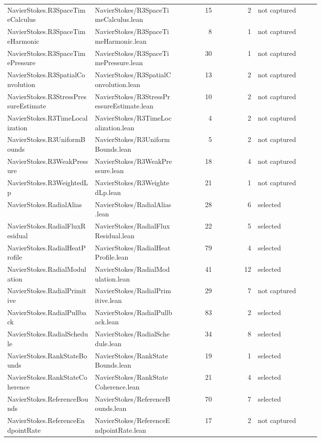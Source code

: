 \documentclass[10pt]{article}
\begin{document}
\begin{longtable}{p{0.28\linewidth}p{0.27\linewidth}r r p{0.20\linewidth}}
NavierStokes.R3SpaceTimeCalculus & NavierStokes/R3SpaceTimeCalculus.lean & 15 & 2 & not captured\\
NavierStokes.R3SpaceTimeHarmonic & NavierStokes/R3SpaceTimeHarmonic.lean & 8 & 1 & not captured\\
NavierStokes.R3SpaceTimePressure & NavierStokes/R3SpaceTimePressure.lean & 30 & 1 & not captured\\
NavierStokes.R3SpatialConvolution & NavierStokes/R3SpatialConvolution.lean & 13 & 2 & not captured\\
NavierStokes.R3StressPressureEstimate & NavierStokes/R3StressPressureEstimate.lean & 10 & 2 & not captured\\
NavierStokes.R3TimeLocalization & NavierStokes/R3TimeLocalization.lean & 4 & 2 & not captured\\
NavierStokes.R3UniformBounds & NavierStokes/R3UniformBounds.lean & 5 & 2 & not captured\\
NavierStokes.R3WeakPressure & NavierStokes/R3WeakPressure.lean & 18 & 4 & not captured\\
NavierStokes.R3WeightedLp & NavierStokes/R3WeightedLp.lean & 21 & 1 & not captured\\
NavierStokes.RadialAlias & NavierStokes/RadialAlias.lean & 28 & 6 & selected\\
NavierStokes.RadialFluxResidual & NavierStokes/RadialFluxResidual.lean & 22 & 5 & selected\\
NavierStokes.RadialHeatProfile & NavierStokes/RadialHeatProfile.lean & 79 & 4 & selected\\
NavierStokes.RadialModulation & NavierStokes/RadialModulation.lean & 41 & 12 & selected\\
NavierStokes.RadialPrimitive & NavierStokes/RadialPrimitive.lean & 29 & 7 & not captured\\
NavierStokes.RadialPullback & NavierStokes/RadialPullback.lean & 83 & 2 & selected\\
NavierStokes.RadialSchedule & NavierStokes/RadialSchedule.lean & 34 & 8 & selected\\
NavierStokes.RankStateBounds & NavierStokes/RankStateBounds.lean & 19 & 1 & selected\\
NavierStokes.RankStateCoherence & NavierStokes/RankStateCoherence.lean & 21 & 4 & selected\\
NavierStokes.ReferenceBounds & NavierStokes/ReferenceBounds.lean & 70 & 7 & selected\\
NavierStokes.ReferenceEndpointRate & NavierStokes/ReferenceEndpointRate.lean & 17 & 2 & not captured\\

\end{longtable}
\end{document}
